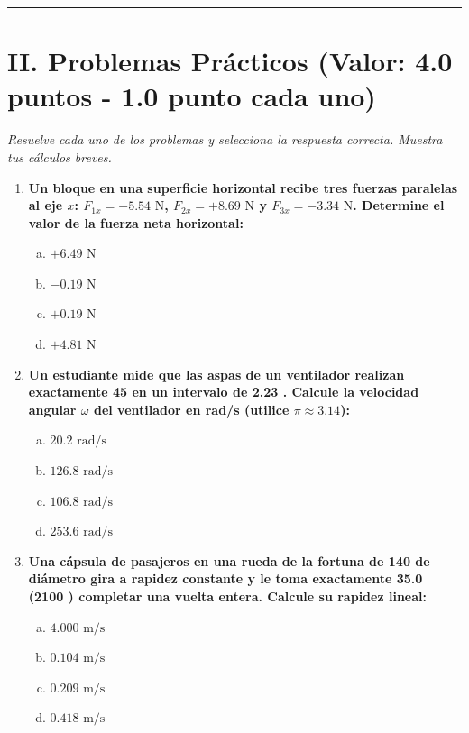\documentclass[11pt,a4paper]{article}
\begin{document}
\hrule
\section*{II. Problemas Prácticos (Valor: 4.0 puntos - 1.0 punto cada uno)}
\textit{Resuelve cada uno de los problemas y selecciona la respuesta correcta. Muestra tus cálculos breves.}

\begin{enumerate}
    \item \textbf{Un bloque en una superficie horizontal recibe tres fuerzas paralelas al eje $x$: $F_{1x} = -5.54 \text{ N}$, $F_{2x} = +8.69 \text{ N}$ y $F_{3x} = -3.34 \text{ N}$. Determine el valor de la fuerza neta horizontal:}
    \begin{enumerate}[a)]
        \item $+6.49 \text{ N}$
        \item $-0.19 \text{ N}$
        \item $+0.19 \text{ N}$
        \item $+4.81 \text{ N}$
    \end{enumerate}

    \item \textbf{Un estudiante mide que las aspas de un ventilador realizan exactamente 45  en un intervalo de 2.23 . Calcule la velocidad angular $\omega$ del ventilador en rad/s (utilice $\pi \approx 3.14$):}
    \begin{enumerate}[a)]
        \item $20.2 \text{ rad/s}$
        \item $126.8 \text{ rad/s}$
        \item $106.8 \text{ rad/s}$
        \item $253.6 \text{ rad/s}$
    \end{enumerate}

    \item \textbf{Una cápsula de pasajeros en una rueda de la fortuna de 140  de diámetro gira a rapidez constante y le toma exactamente 35.0  (2100 ) completar una vuelta entera. Calcule su rapidez lineal:}
    \begin{enumerate}[a)]
        \item $4.000 \text{ m/s}$
        \item $0.104 \text{ m/s}$
        \item $0.209 \text{ m/s}$
        \item $0.418 \text{ m/s}$
    \end{enumerate}


\end{enumerate}
\end{document}
